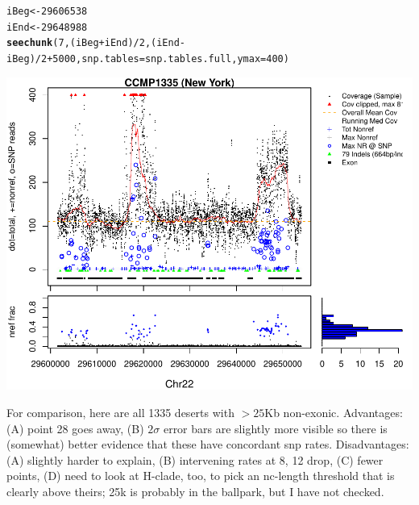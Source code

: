 \documentclass{article}\usepackage[]{graphicx}\usepackage[]{color}
\makeatletter
\def\maxwidth{ %
  \ifdim\Gin@nat@width>\linewidth
    \linewidth
  \else
    \Gin@nat@width
  \fi
}
\newcommand{\hlnum}[1]{\textcolor[rgb]{0.686,0.059,0.569}{#1}}%
\newcommand{\hlopt}[1]{\textcolor[rgb]{0,0,0}{#1}}%
\newcommand{\hlstd}[1]{\textcolor[rgb]{0.345,0.345,0.345}{#1}}%
\newcommand{\hlkwb}[1]{\textcolor[rgb]{0.69,0.353,0.396}{#1}}%
\newcommand{\hlkwc}[1]{\textcolor[rgb]{0.333,0.667,0.333}{#1}}%
\newcommand{\hlkwd}[1]{\textcolor[rgb]{0.737,0.353,0.396}{\textbf{#1}}}%
\newenvironment{kframe}{%
 \def\at@end@of@kframe{}%
 \ifinner\ifhmode%
  \def\at@end@of@kframe{\end{minipage}}%
  \begin{minipage}{\columnwidth}%
 \fi\fi%
 \def\FrameCommand##1{\hskip\@totalleftmargin \hskip-\fboxsep
 \colorbox{shadecolor}{##1}\hskip-\fboxsep
     \hskip-\linewidth \hskip-\@totalleftmargin \hskip\columnwidth}%
 \MakeFramed {\advance\hsize-\width
   \@totalleftmargin\z@ \linewidth\hsize
   \@setminipage}}%
 {\par\unskip\endMakeFramed%
 \at@end@of@kframe}
\newenvironment{knitrout}{}{} %
\makeatother
\begin{document}
\begin{knitrout}\scriptsize
{}\color{fgcolor}\begin{kframe}
\begin{alltt}
\hlstd{iBeg} \hlkwb{<-} \hlnum{29606538}
\hlstd{iEnd} \hlkwb{<-} \hlnum{29648988}
\hlkwd{seechunk}\hlstd{(}\hlnum{7}\hlstd{,(iBeg}\hlopt{+}\hlstd{iEnd)}\hlopt{/}\hlnum{2}\hlstd{,(iEnd}\hlopt{-}\hlstd{iBeg)}\hlopt{/}\hlnum{2}\hlopt{+}\hlnum{5000}\hlstd{,}\hlkwc{snp.tables}\hlstd{=snp.tables.full,}\hlkwc{ymax}\hlstd{=}\hlnum{400}\hlstd{)}
\end{alltt}
\end{kframe}

{\centering \includegraphics[width=\maxwidth]{figs-knitr/ch22-undes-1} 

}



\end{knitrout}

For comparison, here are all 1335 deserts with $>25$Kb non-exonic.  Advantages: (A) point 28 goes away, (B) $2\sigma$ error bars are slightly more visible so there is (somewhat) better evidence that these have concordant snp rates.  Disadvantages: (A) slightly harder to explain, (B) intervening rates at 8, 12 drop,  (C) fewer points, (D) need to look at H-clade, too, to pick an nc-length threshold that is clearly above theirs; 25k is probably in the ballpark, but I have not checked.
\end{document}
